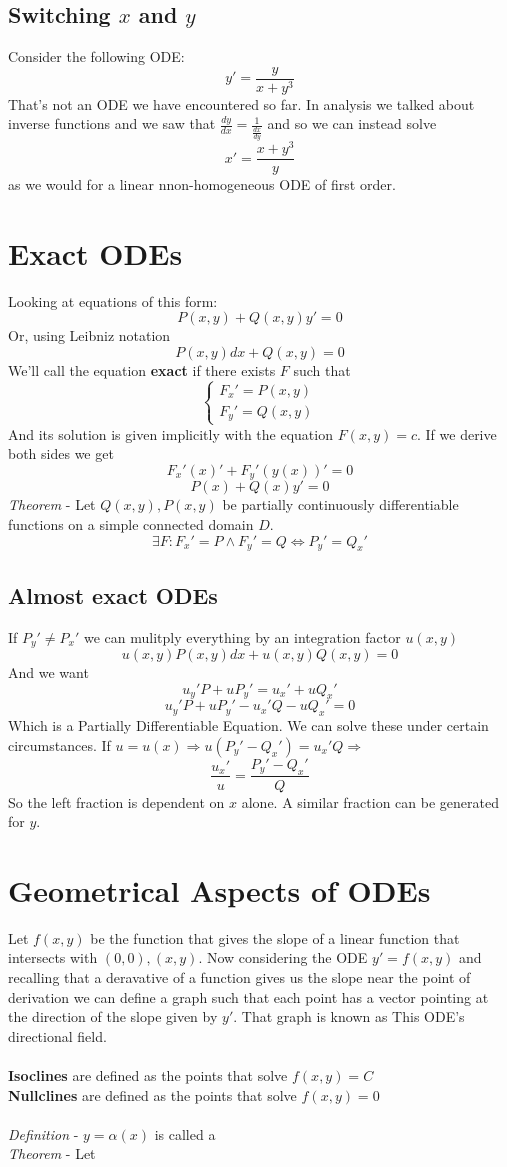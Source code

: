 \documentclass{article}
\begin{document}
	\subsection{Switching $x$ and $y$}
	Consider the following ODE:
	$$y'=\frac y{x+y^3}$$
	That's not an ODE we have encountered so far. In analysis we talked about inverse functions and we saw that $\frac{dy}{dx} = \frac{1}{\frac{dx}{dy}}$ and so we can instead solve
	$$x' = \frac{x+y^3}{y}$$
as we would for a linear nnon-homogeneous ODE of first order.
\newpage
\section{Exact ODEs}
Looking at equations of this form:
$$P(x,y)+Q(x,y)y'=0$$
Or, using Leibniz notation
$$P(x,y)dx+Q(x,y) = 0$$
We'll call the equation \textbf{exact} if there exists $F$ such that
\begin{equation*}
    \begin{cases}
    F_x'=P(x,y) \\
    F_y'=Q(x,y)
    \end{cases}
\end{equation*}
And its solution is given implicitly with the equation $F(x,y)=c$. If we derive both sides we get
$$F_x'(x)'+F_y'(y(x))'=0$$
$$P(x)+Q(x)y'=0$$
\emph{Theorem} - Let $Q(x,y),P(x,y)$ be partially continuously differentiable functions on a simple connected domain $D$.
$$\exists F: F_x'=P\land F_y'=Q \iff P_y'=Q_x'$$
\subsection{Almost exact ODEs}
If $P_y'\ne P_x'$ we can mulitply everything by an integration factor $u(x,y)$
$$u(x,y)P(x,y)dx+u(x,y)Q(x,y) = 0$$
And we want
$$u_y'P+uP_y' = u_x'+uQ_x'$$
$$u_y'P+uP_y' - u_x'Q - uQ_x' = 0$$
Which is a Partially Differentiable Equation. We can solve these under certain circumstances. If $u=u(x) \Rightarrow u(P_y' - Q_x') = u_x'Q \Rightarrow$
$$\frac{u_x'}{u}=\frac{P_y'-Q_x'}{Q}$$
So the left fraction is dependent on $x$ alone. A similar fraction can be generated for $y$.
\newpage
\section{Geometrical Aspects of ODEs}
Let $f(x,y)$ be the function that gives the slope of a linear function that intersects with $(0,0),(x,y)$. Now considering the ODE $y'=f(x,y)$ and recalling that a deravative of a function gives us the slope near the point of derivation we can define a graph such that each point has a vector pointing at the direction of the slope given by $y'$. That graph is known as This ODE's directional field.
\\\\
\textbf{Isoclines} are defined as the points that solve $f(x,y)=C$\\
\textbf{Nullclines} are defined as the points that solve $f(x,y)=0$
\\\\
\emph{Definition} - $y=\alpha(x)$ is called a 
\\
\emph{Theorem} -  Let
\end{document}
